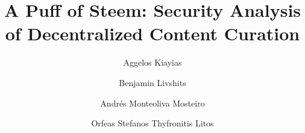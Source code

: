 \title{A Puff of Steem: Security Analysis of Decentralized Content Curation}
\author{Aggelos Kiayias \and Benjamin Livshits \and Andr\'es
Monteoliva Mosteiro \and Orfeas Stefanos Thyfronitis Litos}
\maketitle
